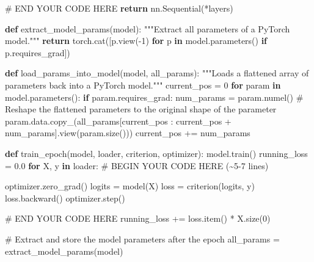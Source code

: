 \documentclass[
  letterpaper,
  DIV=11,
  numbers=noendperiod]{scrartcl}
\newenvironment{Shaded}{\begin{snugshade}}{\end{snugshade}}
\newcommand{\CommentTok}[1]{\textcolor[rgb]{0.37,0.37,0.37}{#1}}
\newcommand{\ControlFlowTok}[1]{\textcolor[rgb]{0.00,0.23,0.31}{\textbf{#1}}}
\newcommand{\DecValTok}[1]{\textcolor[rgb]{0.68,0.00,0.00}{#1}}
\newcommand{\FloatTok}[1]{\textcolor[rgb]{0.68,0.00,0.00}{#1}}
\newcommand{\KeywordTok}[1]{\textcolor[rgb]{0.00,0.23,0.31}{\textbf{#1}}}
\newcommand{\NormalTok}[1]{\textcolor[rgb]{0.00,0.23,0.31}{#1}}
\newcommand{\OperatorTok}[1]{\textcolor[rgb]{0.37,0.37,0.37}{#1}}
\newcommand{\RegionMarkerTok}[1]{\textcolor[rgb]{0.00,0.23,0.31}{#1}}
\begin{document}
\begin{Shaded}
\begin{Highlighting}[]
    \CommentTok{\# }\RegionMarkerTok{END}\CommentTok{ YOUR CODE HERE}
    \ControlFlowTok{return}\NormalTok{ nn.Sequential(}\OperatorTok{*}\NormalTok{layers)}

\KeywordTok{def}\NormalTok{ extract\_model\_params(model):}
    \CommentTok{"""Extract all parameters of a PyTorch model."""}
    \ControlFlowTok{return}\NormalTok{ torch.cat([p.view(}\OperatorTok{{-}}\DecValTok{1}\NormalTok{) }\ControlFlowTok{for}\NormalTok{ p }\KeywordTok{in}\NormalTok{ model.parameters() }\ControlFlowTok{if}\NormalTok{ p.requires\_grad])}

\KeywordTok{def}\NormalTok{ load\_params\_into\_model(model, all\_params):}
    \CommentTok{"""Loads a flattened array of parameters back into a PyTorch model."""}
\NormalTok{    current\_pos }\OperatorTok{=} \DecValTok{0}
    \ControlFlowTok{for}\NormalTok{ param }\KeywordTok{in}\NormalTok{ model.parameters():}
        \ControlFlowTok{if}\NormalTok{ param.requires\_grad:}
\NormalTok{            num\_params }\OperatorTok{=}\NormalTok{ param.numel()}
            \CommentTok{\# Reshape the flattened parameters to the original shape of the parameter}
\NormalTok{            param.data.copy\_(all\_params[current\_pos : current\_pos }\OperatorTok{+}\NormalTok{ num\_params].view(param.size()))}
\NormalTok{            current\_pos }\OperatorTok{+=}\NormalTok{ num\_params}

\KeywordTok{def}\NormalTok{ train\_epoch(model, loader, criterion, optimizer):}
\NormalTok{    model.train()}
\NormalTok{    running\_loss }\OperatorTok{=} \FloatTok{0.0}
    \ControlFlowTok{for}\NormalTok{ X, y }\KeywordTok{in}\NormalTok{ loader:}
        \CommentTok{\# }\RegionMarkerTok{BEGIN}\CommentTok{ YOUR CODE HERE (\textasciitilde{}5{-}7 lines)}


\NormalTok{        optimizer.zero\_grad()}
\NormalTok{        logits }\OperatorTok{=}\NormalTok{ model(X)}
\NormalTok{        loss }\OperatorTok{=}\NormalTok{ criterion(logits, y)}
\NormalTok{        loss.backward()}
\NormalTok{        optimizer.step()}



        \CommentTok{\# }\RegionMarkerTok{END}\CommentTok{ YOUR CODE HERE}
\NormalTok{        running\_loss }\OperatorTok{+=}\NormalTok{ loss.item() }\OperatorTok{*}\NormalTok{ X.size(}\DecValTok{0}\NormalTok{)}

    \CommentTok{\# Extract and store the model parameters after the epoch}
\NormalTok{    all\_params }\OperatorTok{=}\NormalTok{ extract\_model\_params(model)}


\end{Highlighting}
\end{Shaded}
\end{document}
